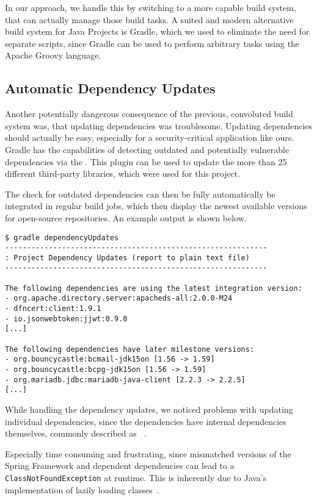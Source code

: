 In our approach, we handle this by switching to a more capable build system, that can actually manage those build tasks.
A suited and modern alternative build system for Java Projects is Gradle, which we used to eliminate the need for
separate scripts, since Gradle can be used to perform arbitrary tasks using the Apache Groovy language.

\subsection*{Automatic Dependency Updates}
Another potentially dangerous consequence of the previous, convoluted build system was, that updating dependencies was
troublesome.
Updating dependencies should actually be easy, especially for a security-critical application like ours.
Gradle has the capabilities of detecting outdated and potentially vulnerable dependencies via the
.
This plugin can be used to update the more than 25 different third-party libraries, which were used for this project.

The check for outdated dependencies can then be fully automatically be integrated in regular build jobs, which then
display the newest available versions for open-source repositories.
An example output is shown below.

\begin{lstlisting}
$ gradle dependencyUpdates
------------------------------------------------------------
: Project Dependency Updates (report to plain text file)
------------------------------------------------------------

The following dependencies are using the latest integration version:
- org.apache.directory.server:apacheds-all:2.0.0-M24
- dfncert:client:1.9.1
- io.jsonwebtoken:jjwt:0.9.0
[...]

The following dependencies have later milestone versions:
- org.bouncycastle:bcmail-jdk15on [1.56 -> 1.59]
- org.bouncycastle:bcpg-jdk15on [1.56 -> 1.59]
- org.mariadb.jdbc:mariadb-java-client [2.2.3 -> 2.2.5]
[...]
\end{lstlisting}

While handling the dependency updates, we noticed problems with updating individual dependencies, since the dependencies
have internal dependencies themselves, commonly described as ~\cite{jang2006linux}.

Especially time consuming and frustrating, since mismatched versions of the Spring Framework and dependent dependencies
can lead to a \lstinline{ClassNotFoundException} at runtime.
This is inherently due to Java's implementation of lazily loading classes~\cite{gosling2014java}.

